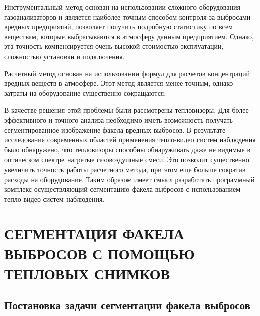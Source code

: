 \documentclass[14pt, a4paper]{extreport}
\begin{document}
	Инструментальный метод основан на использовании сложного оборудования -- газоанализаторов и является наиболее точным способом контроля за выбросами вредных предприятий, позволяет получить подробную статистику по всем веществам, которые выбрасываются в атмосферу данным предприятием. Однако, эта точность компенсируется очень высокой стоимостью эксплуатации, сложностью установки и подключения. 
	
	Расчетный метод основан на использовании формул для расчетов концентраций вредных веществ в атмосфере. Этот метод является менее точным, однако затраты на оборудование существенно сокращаются.
	
	В качестве решения этой проблемы были рассмотрены тепловизоры. Для более эффективного и точного анализа необходимо иметь возможность получать сегментированное изображение факела вредных выбросов. В результате исследования современных областей применения тепло-видео систем наблюдения было обнаружено, что тепловизоры способны обнаруживать даже не видимые в оптическом спектре нагретые газовоздушные смеси. Это позволит существенно увеличить точность работы расчетного метода, при этом еще больше сократив расходы на оборудование. Таким образом имеет смысл разработать программный комплекс осуществляющий сегментацию факела выбросов с использованием тепло-видео систем наблюдения.
	
\chapter[\vspace*{-0.22cm}СЕГМЕНТАЦИЯ ФАКЕЛА ВЫБРОСОВ С ПОМОЩЬЮ \\ \hspace*{-0.35cm}ТЕПЛОВЫХ СНИМКОВ]{\vspace*{-0.22cm}СЕГМЕНТАЦИЯ ФАКЕЛА ВЫБРОСОВ С ПОМОЩЬЮ ТЕПЛОВЫХ СНИМКОВ}
\section{Постановка задачи сегментации факела выбросов}
\end{document}
